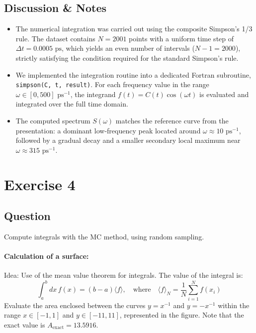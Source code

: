 \documentclass[11pt,a4paper]{article}
\begin{document}
\subsection{Discussion \& Notes}
\begin{itemize}
  \item The numerical integration was carried out using the composite Simpson's 1/3 rule. The dataset contains $N = 2001$ points with a uniform time step of $\Delta t = 0.0005\text{ ps}$, which yields an even number of intervals ($N - 1 = 2000$), strictly satisfying the condition required for the standard Simpson's rule.

  \item We implemented the integration routine into a dedicated Fortran subroutine, \texttt{simpson(C, t, result)}. For each frequency value in the range $\omega \in [0, 500]\text{ ps}^{-1}$, the integrand $f(t) = C(t)\cos(\omega t)$ is evaluated and integrated over the full time domain.

  \item The computed spectrum $S(\omega)$ matches the reference curve from the presentation: a dominant low-frequency peak located around $\omega \approx 10\text{ ps}^{-1}$, followed by a gradual decay and a smaller secondary local maximum near $\omega \approx 315\text{ ps}^{-1}$.
\end{itemize}

\newpage
\section{Exercise 4}

\subsection{Question}
Compute integrals with the MC method, using random sampling.

\paragraph{Calculation of a surface:}
Idea: Use of the mean value theorem for integrals. The value of the integral is:
\begin{equation}
  \int_a^b dx\, f(x) = (b - a)\langle f \rangle, \quad \text{where} \quad \langle f \rangle_N = \frac{1}{N}\sum_{i=1}^N f(x_i)
\end{equation}
Evaluate the area enclosed between the curves $y = x^{-1}$ and $y = -x^{-1}$ within the range $x \in [-1, 1]$ and $y \in [-11, 11]$, represented in the figure. Note that the exact value is $A_{\text{exact}} = 13.5916$.
\end{document}
